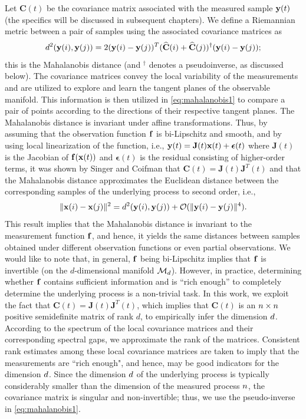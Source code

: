 Let $\mathbf{C}(t)$ be the covariance matrix associated with the measured sample $\mathbf{y}(t)$ (the specifics will be discussed in subsequent chapters). 
%
We define a Riemannian metric between a pair of samples using the associated covariance matrices as
\begin{equation}
	d^2(\mathbf{y}(i), \mathbf{y}(j)) = 2 (\mathbf{y}(i) - \mathbf{y}(j))^T(\widehat{\mathbf{C}}(i) + \widehat{\mathbf{C}}(j))^{\dagger}(\mathbf{y}(i) - \mathbf{y}(j));
	\label{eq:mahalanobis1}
\end{equation}
this is the Mahalanobis distance (and $^{\dagger}$ denotes a pseudoinverse, as discussed below).
%
The covariance matrices convey the local variability of the measurements and are utilized to explore and learn the tangent planes of the observable manifold.
%
This information is then utilized in \eqref{eq:mahalanobis1} to compare a pair of points according to the directions of their respective tangent planes.
%
The Mahalanobis distance is invariant under affine transformations.
%
Thus, by assuming that the observation function $\mathbf{f}$ is bi-Lipschitz and smooth, and by using local linearization of the function, i.e., $\mathbf{y}(t) = \mathbf{J}(t) \mathbf{x}(t) + \boldsymbol{\epsilon}(t)$ where $\mathbf{J}(t)$ is the Jacobian of $\mathbf{f}(\mathbf{x}(t))$ and $\boldsymbol{\epsilon}(t)$ is the residual consisting of higher-order terms, it was shown by Singer and Coifman \cite{singer2008non} that $\mathbf{C}(t) = \mathbf{J}(t)\mathbf{J}^T(t)$ and that the Mahalanobis distance approximates the Euclidean distance between the corresponding samples of the underlying process to second order, i.e.,
\begin{equation}
	\| \mathbf{x}(i) - \mathbf{x}(j) \|^2 = d^2(\mathbf{y}(i), \mathbf{y}(j)) + \mathcal{O}(\| \mathbf{y}(i) - \mathbf{y}(j)\|^4).
\end{equation}
%
This result implies that the Mahalanobis distance is invariant to the measurement function $\mathbf{f}$, and hence,
it yields the same distances between samples obtained under different observation functions or even partial observations.
%
We would like to note that, in general, $\mathbf{f}$ being bi-Lipschitz implies that $\mathbf{f}$ is invertible (on the $d$-dimensional
manifold $\mathcal{M}_d$).
%
However, in practice, determining whether $\mathbf{f}$ contains sufficient information and is ``rich enough'' to completely determine the underlying process is a non-trivial task.
%
In this work, we exploit the fact that $\mathbf{C}(t) = \mathbf{J}(t)\mathbf{J}^T(t)$, which implies that $\mathbf{C}(t)$ is an $n \times n$ positive semidefinite matrix of rank $d$, to empirically infer the dimension $d$.
%
According to the spectrum of the local covariance matrices and their corresponding spectral gaps, we approximate the rank of the matrices.
%
Consistent rank estimates among these local covariance matrices are taken to imply that the measurements are ``rich enough", and hence, may be good indicators for the dimension $d$.
%
Since the dimension $d$ of the underlying process is typically considerably smaller than the dimension of the measured process $n$,
the covariance matrix is singular and non-invertible;
%
thus, we use the pseudo-inverse in \eqref{eq:mahalanobis1}.


